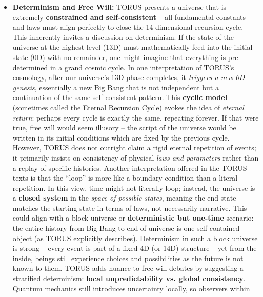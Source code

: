 \documentclass[
]{article}
\begin{document}
\begin{itemize}
\item
  \textbf{Determinism and Free Will:} TORUS presents a universe that is
  extremely \textbf{constrained and self-consistent} -- all fundamental
  constants and laws must align perfectly to close the 14-dimensional
  recursion cycle\hspace{0pt}. This inherently invites a discussion on
  determinism. If the state of the universe at the highest level (13D)
  must mathematically feed into the initial state (0D) with no
  remainder, one might imagine that everything is pre-determined in a
  grand cosmic cycle. In one interpretation of TORUS's cosmology, after
  our universe's 13D phase completes, it \emph{triggers a new 0D
  genesis}, essentially a new Big Bang that is not independent but a
  continuation of the same self-consistent pattern\hspace{0pt}. This
  \textbf{cyclic model} (sometimes called the Eternal Recursion Cycle)
  evokes the idea of \emph{eternal return}: perhaps every cycle is
  exactly the same, repeating forever. If that were true, free will
  would seem illusory -- the script of the universe would be written in
  its initial conditions which are fixed by the previous cycle. However,
  TORUS does not outright claim a rigid eternal repetition of events; it
  primarily insists on consistency of physical \emph{laws and
  parameters} rather than a replay of specific histories. Another
  interpretation offered in the TORUS texts is that the ``loop'' is more
  like a boundary condition than a literal repetition\hspace{0pt}. In
  this view, time might not literally loop; instead, the universe is a
  \textbf{closed system} in the \emph{space of possible states}, meaning
  the end state matches the starting state in terms of laws, not
  necessarily narrative. This could align with a block-universe or
  \textbf{deterministic but one-time} scenario: the entire history from
  Big Bang to end of universe is one self-contained object (as TORUS
  explicitly describes)\hspace{0pt}. Determinism in such a block
  universe is strong -- every event is part of a fixed 4D (or 14D)
  structure -- yet from the inside, beings still experience choices and
  possibilities as the future is not known to them. TORUS adds nuance to
  free will debates by suggesting a stratified determinism:
  \textbf{local unpredictability vs. global consistency}. Quantum
  mechanics still introduces uncertainty locally, so observers within

\end{itemize}
\end{document}
